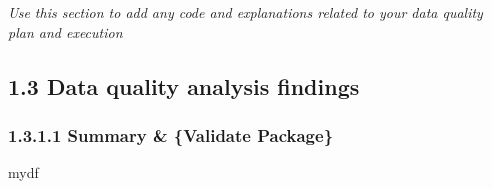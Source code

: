 \documentclass[
]{article}
\newenvironment{Shaded}{\begin{snugshade}}{\end{snugshade}}
\newcommand{\NormalTok}[1]{#1}
\begin{document}
\emph{Use this section to add any code and explanations related to your
data quality plan and execution}

\subsection{1.3 Data quality analysis
findings}\label{data-quality-analysis-findings}

\subsubsection{1.3.1.1 Summary \& \{Validate
Package\}}\label{summary-validate-package}

\begin{Shaded}
\begin{Highlighting}[]
\NormalTok{mydf}
\end{Highlighting}
\end{Shaded}
\end{document}
